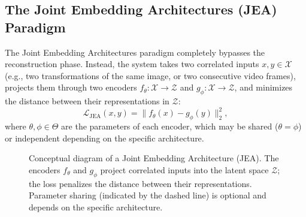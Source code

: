 \documentclass[11pt, oneside, openany]{book}
\begin{document}
\subsection{The Joint Embedding Architectures (JEA) Paradigm}
\label{sec:1.2.3}

The Joint Embedding Architectures paradigm completely bypasses the reconstruction phase. Instead, the system takes two correlated inputs $x, y \in \mathcal{X}$ (e.g., two transformations of the same image, or two consecutive video frames), projects them through two encoders $f_{\theta} \colon \mathcal{X} \to \mathcal{Z}$ and $g_{\phi} \colon \mathcal{X} \to \mathcal{Z}$, and minimizes the distance between their representations in $\mathcal{Z}$:
\begin{equation}
\label{eq:1.2}
\mathcal{L}_{\text{JEA}}(x,y) = \lVert f_{\theta}(x) - g_{\phi}(y) \rVert_{2}^{2},
\end{equation}
where $\theta, \phi \in \Theta$ are the parameters of each encoder, which may be shared ($\theta = \phi$) or independent depending on the specific architecture.

\begin{figure}[H]
\centering
{}
\caption{Conceptual diagram of a Joint Embedding Architecture (JEA). The encoders $f_\theta$ and $g_\phi$ project correlated inputs into the latent space $\mathcal{Z}$; the loss penalizes the distance between their representations. Parameter sharing (indicated by the dashed line) is optional and depends on the specific architecture.}
\label{fig:1.1}
\end{figure}
\end{document}

